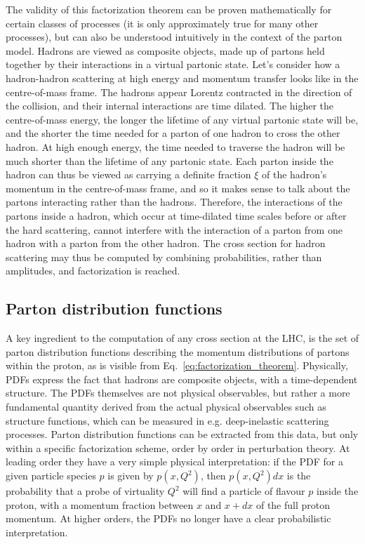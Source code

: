 The validity of this factorization theorem can be proven mathematically for certain classes of
processes (it is only approximately true for many other processes), but can also be understood
intuitively in the context of the parton model. 
Hadrons are viewed as composite objects, made up of partons held together by their interactions in
a virtual partonic state.
Let's consider how a hadron-hadron scattering at high energy and momentum transfer looks like in the
centre-of-mass frame. The hadrons appear Lorentz contracted in the direction of the collision, and
their internal interactions are time dilated. The higher the centre-of-mass energy, the longer the
lifetime of any virtual partonic state will be, and the shorter the time needed for a parton of one
hadron to cross the other hadron. At high enough energy, the time needed to traverse the hadron
will be much shorter than the lifetime of any partonic state. Each parton inside the hadron can
thus be viewed as carrying a definite fraction $\xi$ of the hadron's momentum in the centre-of-mass
frame, and so it makes sense to talk about the partons interacting rather than the hadrons.  
Therefore, the interactions of the partons inside a hadron, which occur at time-dilated time
scales before or after the hard scattering, cannot interfere with the interaction of a parton
from one hadron with a parton from the other hadron. 
The cross section for hadron scattering may thus be computed by
combining probabilities, rather than amplitudes, and factorization is reached. 




\subsection{Parton distribution functions \label{sec:event_pdfs}}

A key ingredient to the computation of any cross section at the LHC, is the set of parton
distribution functions describing the momentum distributions of partons within the proton, as
is visible from Eq.~\ref{eq:factorization_theorem}. 
Physically, PDFs express the fact that hadrons are composite objects, with a time-dependent
structure. The PDFs themselves are not physical observables, but rather a more fundamental quantity
derived from the actual physical observables such as structure functions, which can be measured
in e.g. deep-inelastic scattering processes. 
Parton distribution functions can be extracted from this data, but only within a specific
factorization scheme, order by order in perturbation theory. 
At leading order they have a very simple physical interpretation: if the PDF for a given particle
species $p$ is given by $p(x,Q^2)$, then $p(x,Q^2) dx$ is the probability that a probe of
virtuality $Q^2$ will find a particle of flavour $p$ inside the proton, with a
momentum fraction between $x$ and $x + dx$ of the full proton momentum. 
At higher orders, the PDFs no longer have a clear probabilistic interpretation. 

